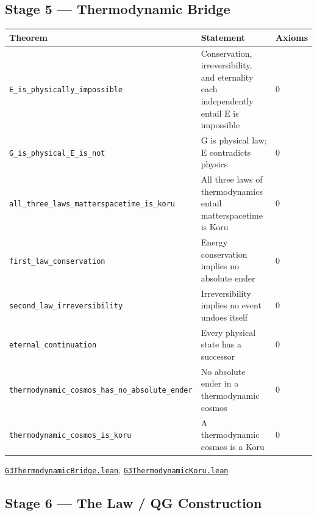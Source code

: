 \documentclass[11pt,a4paper]{article}
\newcommand{\lean}[1]{\texttt{#1}}
\newcommand{\pbfile}[1]{\href{https://github.com/Tobillicious/universal-protection-theory/blob/main/evidence/physical-bridges/PhysicalBridges/#1}{\texttt{\small #1}}}
\begin{document}
\subsection{Stage 5 --- Thermodynamic Bridge}

\begin{longtable}{p{5.5cm}p{8cm}l}
\toprule
\textbf{Theorem} & \textbf{Statement} & \textbf{Axioms} \\
\midrule
\endhead
\lean{E\_is\_physically\_impossible} & Conservation, irreversibility, and eternality each independently entail E is impossible & 0 \\
\lean{G\_is\_physical\_E\_is\_not} & G is physical law; E contradicts physics & 0 \\
\lean{all\_three\_laws\_matterspacetime\_is\_koru} & All three laws of thermodynamics entail matterspacetime is Koru & 0 \\
\lean{first\_law\_conservation} & Energy conservation implies no absolute ender & 0 \\
\lean{second\_law\_irreversibility} & Irreversibility implies no event undoes itself & 0 \\
\lean{eternal\_continuation} & Every physical state has a successor & 0 \\
\lean{thermodynamic\_cosmos\_has\_no\_absolute\_ender} & No absolute ender in a thermodynamic cosmos & 0 \\
\lean{thermodynamic\_cosmos\_is\_koru} & A thermodynamic cosmos is a Koru & 0 \\
\bottomrule
\end{longtable}
\noindent\pbfile{G3ThermodynamicBridge.lean}, \pbfile{G3ThermodynamicKoru.lean}


\subsection{Stage 6 --- The Law / QG Construction}
\end{document}
